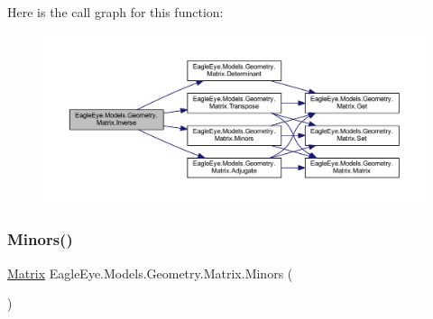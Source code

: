 Here is the call graph for this function\+:\nopagebreak
\begin{figure}[H]
\begin{center}
\leavevmode
\includegraphics[width=350pt]{class_eagle_eye_1_1_models_1_1_geometry_1_1_matrix_a6d951dec401cc5239e3fa57dbae720a2_cgraph}
\end{center}
\end{figure}
\mbox{\label{class_eagle_eye_1_1_models_1_1_geometry_1_1_matrix_a121833737b07b1791264d0f4f10a621b}} 
\subsubsection{\texorpdfstring{Minors()}{Minors()}}
{\footnotesize\ttfamily \mbox{\hyperlink{class_eagle_eye_1_1_models_1_1_geometry_1_1_matrix}{Matrix}} Eagle\+Eye.\+Models.\+Geometry.\+Matrix.\+Minors (\begin{DoxyParamCaption}{ }\end{DoxyParamCaption})}

